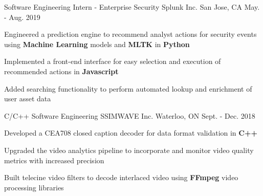 


\begin{cventries}


\cventry
{Software Engineering Intern - Enterprise Security} %
{Splunk Inc.} %
{San Jose, CA} %
{May. - Aug. 2019} %
{ %
\begin{cvitems}
\item {Engineered a prediction engine to recommend analyst actions for security events using {\bf Machine Learning} models and {\bf MLTK} in {\bf Python}}
\item {Implemented a front-end interface for easy selection and execution of recommended actions in {\bf Javascript}}
\item {Added searching functionality to perform automated lookup and enrichment of user asset data}
\end{cvitems}
}


\cventry
{C/C++ Software Engineering} %
{SSIMWAVE Inc.} %
{Waterloo, ON} %
{Sept. - Dec. 2018} %
{ %
\begin{cvitems}
\item {Developed a CEA708 closed caption decoder for data format validation in {\bf C++}}
\item {Upgraded the video analytics pipeline to incorporate and monitor video quality metrics with increased precision}
\item {Built telecine video filters to decode interlaced video using {\bf FFmpeg} video processing libraries}
\end{cvitems}
}



\end{cventries}

